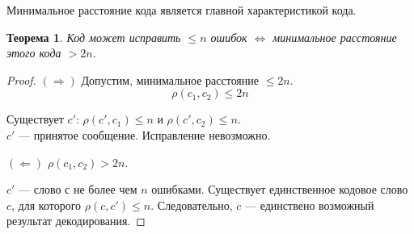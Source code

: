 \documentclass[a4paper,14pt, draft]{report}
\newtheorem{theorem}{Теорема}
\begin{document}
Минимальное расстояние кода является главной характеристикой кода.

\begin{theorem}Код может исправить $\le n$ ошибок $\Leftrightarrow$ минимальное расстояние этого кода $>2n$.
\end{theorem}
\begin{proof}$(\Rightarrow)$ Допустим, минимальное расстояние $\le 2n$. $$\rho(c_1, c_2)\le 2n$$

Существует $c'$: $\rho(c', c_1)\le n$ и $\rho(c', c_2)\le n$.\\$c'$ --- принятое сообщение. Исправление невозможно.

$(\Leftarrow)$ $\rho(c_1, c_2) > 2n$.

$c'$ --- слово с не более чем $n$ ошибками. Существует единственное кодовое слово $c$, для которого $\rho(c, c')\le n$. Следовательно, $c$ --- единствено возможный результат декодирования.
\end{proof}
\end{document}
